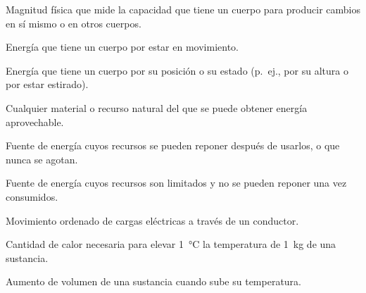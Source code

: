 \begin{vocabulary}
    Magnitud física que mide la capacidad que tiene un cuerpo para producir cambios en sí mismo o en otros cuerpos.
\end{vocabulary}

\begin{vocabulary}
    Energía que tiene un cuerpo por estar en movimiento.
\end{vocabulary}

\begin{vocabulary}
    Energía que tiene un cuerpo por su posición o su estado (p.\ ej., por su altura o por estar estirado).
\end{vocabulary}

\begin{vocabulary}
    Cualquier material o recurso natural del que se puede obtener energía aprovechable.
\end{vocabulary}

\begin{vocabulary}
    Fuente de energía cuyos recursos se pueden reponer después de usarlos, o que nunca se agotan.
\end{vocabulary}

\begin{vocabulary}
    Fuente de energía cuyos recursos son limitados y no se pueden reponer una vez consumidos.
\end{vocabulary}

\begin{vocabulary}
    Movimiento ordenado de cargas eléctricas a través de un conductor.
\end{vocabulary}

\begin{vocabulary}
    Cantidad de calor necesaria para elevar \qty{1}{\celsius} la temperatura de \qty{1}{\kg} de una sustancia.
\end{vocabulary}

\begin{vocabulary}
    Aumento de volumen de una sustancia cuando sube su temperatura.
\end{vocabulary}

